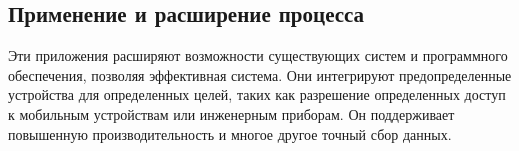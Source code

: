 \subsection{Применение и расширение процесса}
Эти приложения расширяют возможности существующих систем и программного обеспечения, позволяя
эффективная система. Они интегрируют предопределенные устройства для определенных целей, таких как разрешение определенных
доступ к мобильным устройствам или инженерным приборам. Он поддерживает повышенную производительность и многое другое
точный сбор данных.